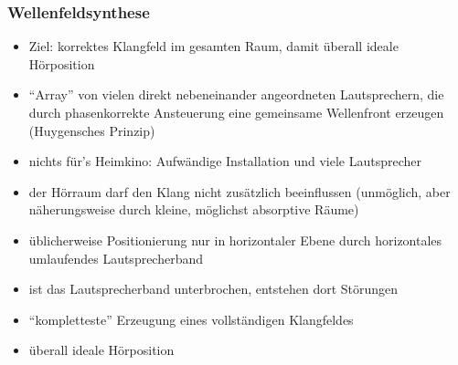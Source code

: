 \documentclass[a4paper, 12pt]{article}
\begin{document}
\subsubsection*{Wellenfeldsynthese}
\begin{itemize}
  \item Ziel: korrektes Klangfeld im gesamten Raum, damit überall ideale Hörposition
  \item ``Array'' von vielen direkt nebeneinander angeordneten Lautsprechern, die durch phasenkorrekte Ansteuerung eine gemeinsame Wellenfront erzeugen (Huygensches Prinzip)
\end{itemize}
\begin{itemize}
  \renewcommand{\labelitemi}{\(-\)}%
  \item nichts für's Heimkino: Aufwändige Installation und viele Lautsprecher
  \item der Hörraum darf den Klang nicht zusätzlich beeinflussen (unmöglich, aber näherungsweise durch kleine, möglichst absorptive Räume)
  \item üblicherweise Positionierung nur in horizontaler Ebene durch horizontales umlaufendes Lautsprecherband
  \item ist das Lautsprecherband unterbrochen, entstehen dort Störungen
\end{itemize}
\begin{itemize}
  \renewcommand{\labelitemi}{+}%
  \item ``kompletteste'' Erzeugung eines vollständigen Klangfeldes
  \item überall ideale Hörposition
\end{itemize}
\end{document}
